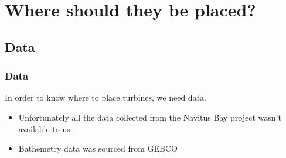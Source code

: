 \documentclass{beamer}
\begin{document}
\section{Where should they be placed?}
\subsection{Data}

\begin{frame}
  \frametitle{Data}
  \begin{figure}
  \end{figure}
  \vspace{-3cm}
  In order to know where to place turbines, we need data.\pause
  \begin{itemize}
    \item Unfortunately all the data collected from the Navitus Bay project wasn't available to us.\pause
    \item Bathemetry data was sourced from GEBCO \autocite{data}
  \end{itemize}
\end{frame}
\end{document}
